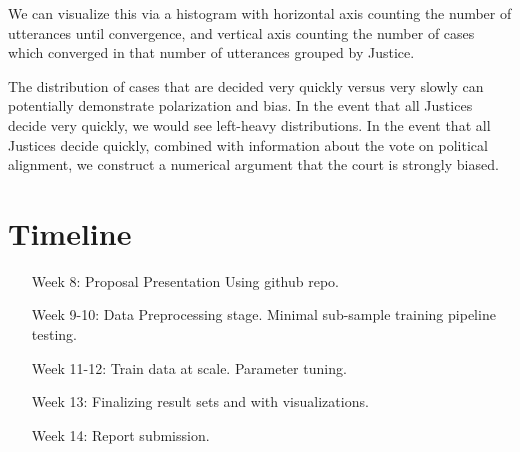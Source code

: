 \documentclass[a4paper]{article}
\begin{document}
We can visualize this via a histogram with horizontal axis counting the number of utterances until convergence, and vertical axis counting the number of cases which converged in that number of utterances grouped by Justice.

The distribution of cases that are decided very quickly versus very slowly can potentially demonstrate polarization and bias. In the event that all Justices decide very quickly, we would see left-heavy distributions. In the event that all Justices decide quickly, combined with information about the vote on political alignment,  we construct a numerical argument that the court is strongly biased.

\section{Timeline}
\begin{enumerate}
  \item[Week 8:]
    Proposal Presentation Using github repo.
  \item[Week 9-10:]
    Data Preprocessing stage.
    Minimal sub-sample training pipeline testing.
  \item[Week 11-12:]
    Train data at scale.
    Parameter tuning.
  \item[Week 13:]
    Finalizing result sets and with visualizations.
  \item[Week 14:]
    Report submission.
\end{enumerate}



\end{document}
